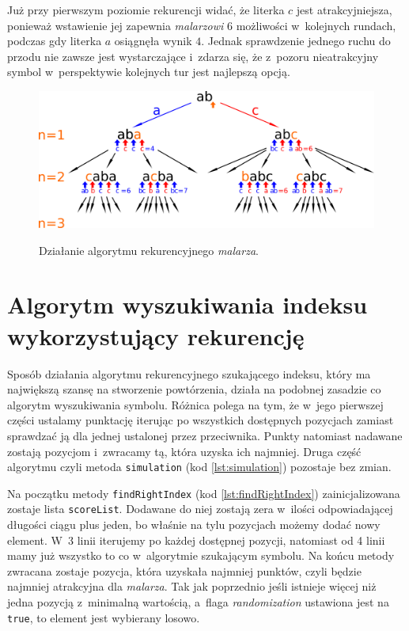 \documentclass[document]{xmgr}
\begin{document}
Już przy pierwszym poziomie rekurencji widać, że literka $c$ jest atrakcyjniejsza, ponieważ wstawienie jej zapewnia \emph{malarzowi} $6$ możliwości w~kolejnych rundach, podczas gdy literka $a$ osiągnęła wynik $4$. Jednak sprawdzenie jednego ruchu do przodu nie zawsze jest wystarczające i~zdarza się, że z~pozoru nieatrakcyjny symbol w~perspektywie kolejnych tur jest najlepszą opcją.
\begin{figure}[tbh]
    \centering
    \caption{Działanie algorytmu rekurencyjnego \emph{malarza}.}
    \includegraphics[width = \textwidth]{images/nestingPainter}
    \label{fig:nestingPainter}
\end{figure}



\section{Algorytm wyszukiwania indeksu wykorzystujący rekurencję}
Sposób działania algorytmu rekurencyjnego szukającego indeksu, który ma największą szansę na stworzenie powtórzenia, działa na podobnej zasadzie co algorytm wyszukiwania symbolu. Różnica polega na tym, że w~jego pierwszej części ustalamy punktację iterując po wszystkich dostępnych pozycjach zamiast sprawdzać ją dla jednej ustalonej przez przeciwnika. Punkty natomiast nadawane zostają pozycjom i~zwracamy tą, która uzyska ich najmniej. Druga część algorytmu czyli metoda \texttt{simulation} (kod \ref{lst:simulation}) pozostaje bez zmian.

Na początku metody \texttt{findRightIndex} (kod \ref{lst:findRightIndex}) zainicjalizowana zostaje lista \texttt{scoreList}. Dodawane do niej zostają zera w~ilości odpowiadającej długości ciągu plus jeden, bo właśnie na tylu pozycjach możemy dodać nowy element. W~3 linii iterujemy po każdej dostępnej pozycji, natomiast od 4 linii mamy już wszystko to co w~algorytmie szukającym symbolu. Na końcu metody zwracana zostaje pozycja, która uzyskała najmniej punktów, czyli będzie najmniej atrakcyjna dla \emph{malarza}. Tak jak poprzednio jeśli istnieje więcej niż jedna pozycją z~minimalną wartością, a~flaga \emph{randomization} ustawiona jest na \texttt{true}, to element jest wybierany losowo.
\end{document}
